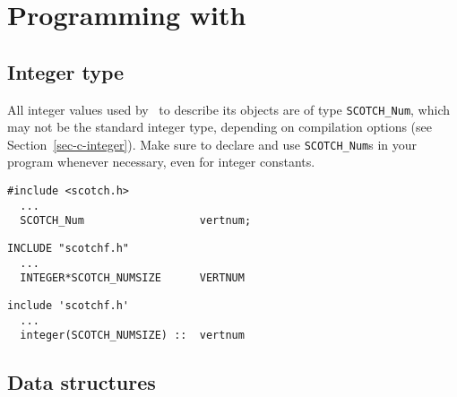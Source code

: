 
\section{Programming with \scotch}

\subsection{Integer type}

All integer values used by \scotch\ to describe its objects are of
type \texttt{SCOTCH\_\lbt Num}, which may not be the standard integer
type, depending on compilation options (see
Section~\ref{sec-c-integer}). Make sure to declare and use
\texttt{SCOTCH\_\lbt Num}s in your program whenever necessary, even
for integer constants.

\begin{lstlisting}[style=language-c]
#include <scotch.h>
  ...
  SCOTCH_Num                  vertnum;
\end{lstlisting}

\begin{lstlisting}[style=language-f]
INCLUDE "scotchf.h"
  ...
  INTEGER*SCOTCH_NUMSIZE      VERTNUM
\end{lstlisting}

\begin{lstlisting}[style=language-f]
include 'scotchf.h'
  ...
  integer(SCOTCH_NUMSIZE) ::  vertnum
\end{lstlisting}

\begin{center}
\end{center}

\subsection{Data structures}


